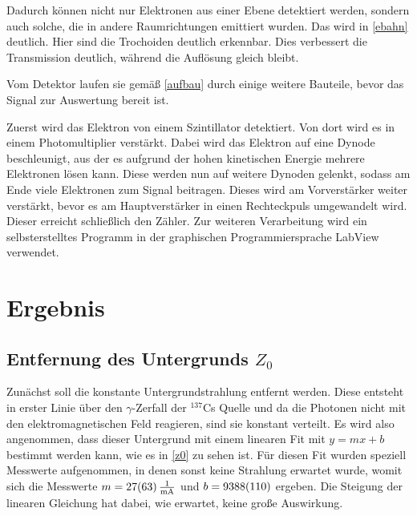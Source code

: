 
Dadurch können nicht nur Elektronen aus einer Ebene detektiert werden, sondern auch solche, die in andere Raumrichtungen emittiert wurden. Das wird in \cref{ebahn} deutlich. Hier sind die Trochoiden deutlich erkennbar. Dies verbessert die Transmission deutlich, während die Auflösung gleich bleibt.


Vom Detektor laufen sie gemäß \cref{aufbau} durch einige weitere Bauteile, bevor das Signal zur Auswertung bereit ist.


Zuerst wird das Elektron von einem Szintillator detektiert. Von dort wird es in einem Photomultiplier verstärkt. Dabei wird das Elektron auf eine Dynode beschleunigt, aus der es aufgrund der hohen kinetischen Energie mehrere Elektronen lösen kann. Diese werden nun auf weitere Dynoden gelenkt, sodass am Ende viele Elektronen zum Signal beitragen. Dieses wird am Vorverstärker weiter verstärkt, bevor es am Hauptverstärker in einen Rechteckpuls umgewandelt wird. Dieser erreicht schließlich den Zähler. Zur weiteren Verarbeitung wird ein selbsterstelltes Programm in der graphischen Programmiersprache LabView verwendet.


\section{Ergebnis}
\subsection{Entfernung des Untergrunds $Z_{0}$}
Zunächst soll die konstante Untergrundstrahlung entfernt werden. Diese entsteht in erster Linie über den $\gamma$-Zerfall der $^{137}$Cs Quelle und da die Photonen nicht mit den elektromagnetischen Feld reagieren, sind sie konstant verteilt. Es wird also angenommen, dass dieser Untergrund mit einem linearen Fit mit $y = mx +b$ bestimmt werden kann, wie es in \cref{z0} zu sehen ist. Für diesen Fit wurden speziell Messwerte aufgenommen, in denen sonst keine Strahlung erwartet wurde, womit sich die Messwerte $m = \SI{27 \pm 63}{\frac{1}{mA}}$ und $b = \SI{9388 \pm 110}{}$ ergeben. Die Steigung der linearen Gleichung hat dabei, wie erwartet, keine große Auswirkung.

